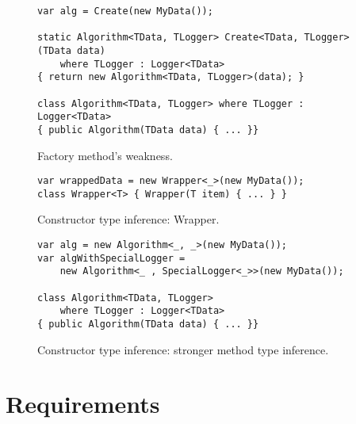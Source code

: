 \par
{}
\begin{figure}
\begin{lstlisting}[style=csharp]
var alg = Create(new MyData());

static Algorithm<TData, TLogger> Create<TData, TLogger>(TData data) 
    where TLogger : Logger<TData> 
{ return new Algorithm<TData, TLogger>(data); } 

class Algorithm<TData, TLogger> where TLogger : Logger<TData> 
{ public Algorithm(TData data) { ... }}
\end{lstlisting}
\caption{Factory method's weakness.}
\label{img35}
\end{figure}
\par
{}
\begin{figure}
\begin{lstlisting}[style=csharp]
var wrappedData = new Wrapper<_>(new MyData());
class Wrapper<T> { Wrapper(T item) { ... } }
\end{lstlisting}
\caption{Constructor type inference: Wrapper.}
\label{img36}
\end{figure}
\par
{}
\begin{figure}
\begin{lstlisting}[style=csharp]
var alg = new Algorithm<_, _>(new MyData());
var algWithSpecialLogger = 
    new Algorithm<_ , SpecialLogger<_>>(new MyData());

class Algorithm<TData, TLogger> 
    where TLogger : Logger<TData> 
{ public Algorithm(TData data) { ... }}
\end{lstlisting}
\caption{Constructor type inference: stronger method type inference.}
\label{img37}
\end{figure}

\section{Requirements}

